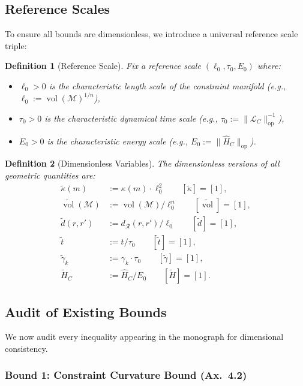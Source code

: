 \documentclass[11pt,a4paper]{article}
\newtheorem{definition}{Definition}[section]
\theoremstyle{remark}
\newcommand{\CR}{\mathcal{R}}
\newcommand{\CM}{\mathcal{M}}
\newcommand{\CL}{\mathcal{L}}
\newcommand{\hatH}{\hat{H}}
\DeclareMathOperator{\vol}{vol}
\begin{document}
\subsection{Reference Scales}

To ensure all bounds are dimensionless, we introduce a universal
reference scale triple:

\begin{definition}[Reference Scale]
\label{def:refscale}
Fix a reference scale $(\ell_0, \tau_0, E_0)$ where:
\begin{itemize}
  \item $\ell_0 > 0$ is the characteristic length scale of the
    constraint manifold (e.g., $\ell_0 := \vol(\CM)^{1/n}$),
  \item $\tau_0 > 0$ is the characteristic dynamical time scale
    (e.g., $\tau_0 := \|\CL_C\|_{\mathrm{op}}^{-1}$),
  \item $E_0 > 0$ is the characteristic energy scale
    (e.g., $E_0 := \|\hatH_C\|_{\mathrm{op}}$).
\end{itemize}
\end{definition}

\begin{definition}[Dimensionless Variables]
\label{def:dimless}
The \emph{dimensionless} versions of all geometric quantities are:
\begin{align}
  \tilde{\kappa}(m) &:= \kappa(m) \cdot \ell_0^2
    \qquad [\tilde{\kappa}] = [1], \\
  \widetilde{\vol}(\CM) &:= \vol(\CM) / \ell_0^n
    \qquad [\widetilde{\vol}] = [1], \\
  \tilde{d}(r,r') &:= d_\CR(r,r') / \ell_0
    \qquad [\tilde{d}] = [1], \\
  \tilde{t} &:= t / \tau_0
    \qquad [\tilde{t}] = [1], \\
  \tilde{\gamma}_k &:= \gamma_k \cdot \tau_0
    \qquad [\tilde{\gamma}] = [1], \\
  \tilde{H}_C &:= \hatH_C / E_0
    \qquad [\tilde{H}] = [1].
\end{align}
\end{definition}

\subsection{Audit of Existing Bounds}

We now audit every inequality appearing in the monograph for dimensional
consistency.

\subsubsection{Bound 1: Constraint Curvature Bound (Ax.~4.2)}
\end{document}

